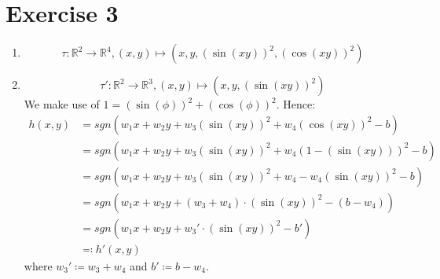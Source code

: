 \documentclass[12pt]{article}
\begin{document}
\section*{Exercise 3}
\begin{enumerate}[label=(\alph*)]
	\item	\[\tau : \mathbb{R}^2 \rightarrow \mathbb{R}^4, (x,y) \mapsto (x,y,(\sin(xy))^2, (\cos(xy))^2)\]
	\item	\[\tau' : \mathbb{R}^2 \rightarrow \mathbb{R}^3, (x,y) \mapsto (x,y, (\sin(xy))^2)\]
			We make use of $1 = (\sin(\phi))^2 + (\cos(\phi))^2$. Hence:
			\begin{align*}
				h(x,y) &= sgn(w_1 x + w_2 y + w_3 (\sin(xy))^2 + w_4 (\cos(xy))^2 - b) \\
				&= sgn(w_1 x + w_2 y + w_3 (\sin(xy))^2 + w_4 (1-(\sin(xy)))^2 - b) \\
				&= sgn(w_1 x + w_2 y + w_3 (\sin(xy))^2 + w_4 - w_4 (\sin(xy))^2 - b) \\
				&= sgn(w_1 x + w_2 y + (w_3 + w_4) \cdot (\sin(xy))^2 - (b - w_4)) \\
				&= sgn(w_1 x + w_2 y + w_3' \cdot (\sin(xy))^2 - b') \\
				&\eqqcolon h'(x,y)
			\end{align*}
			where $w_3' \coloneqq w_3 + w_4$ and $b' \coloneqq b - w_4$.
\end{enumerate}
\end{document}
